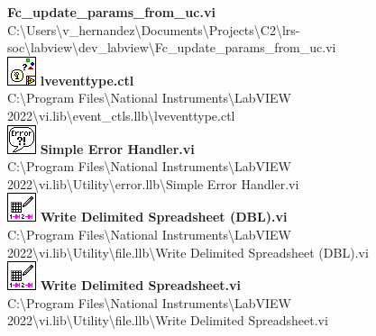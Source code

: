 \documentclass[
]{article}
\begin{document}
\textbf{Fc\_update\_params\_from\_uc.vi\\
}
C:\textbackslash Users\textbackslash v\_hernandez\textbackslash Documents\textbackslash Projects\textbackslash C2\textbackslash lrs-soc\textbackslash labview\textbackslash dev\_labview\textbackslash Fc\_update\_params\_from\_uc.vi\\
\includegraphics{lveventtype_ctlLVtemp20240312184737_13_0.png}
\textbf{lveventtype.ctl\\
} C:\textbackslash Program Files\textbackslash National
Instruments\textbackslash LabVIEW
2022\textbackslash vi.lib\textbackslash event\_ctls.llb\textbackslash lveventtype.ctl\\
\includegraphics{Simple_Error_Handler_viLVtemp20240312184737_14_0.png}
\textbf{Simple Error Handler.vi\\
} C:\textbackslash Program Files\textbackslash National
Instruments\textbackslash LabVIEW
2022\textbackslash vi.lib\textbackslash Utility\textbackslash error.llb\textbackslash Simple
Error Handler.vi\\
\includegraphics{Write_Delimited_Spreadsheet_(DBL)_viLVtemp20240312184737_15_0.png}
\textbf{Write Delimited Spreadsheet (DBL).vi\\
} C:\textbackslash Program Files\textbackslash National
Instruments\textbackslash LabVIEW
2022\textbackslash vi.lib\textbackslash Utility\textbackslash file.llb\textbackslash Write
Delimited Spreadsheet (DBL).vi\\
\includegraphics{Write_Delimited_Spreadsheet_viLVtemp20240312184737_16_0.png}
\textbf{Write Delimited Spreadsheet.vi\\
} C:\textbackslash Program Files\textbackslash National
Instruments\textbackslash LabVIEW
2022\textbackslash vi.lib\textbackslash Utility\textbackslash file.llb\textbackslash Write
Delimited Spreadsheet.vi\\
\strut \\
\end{document}
